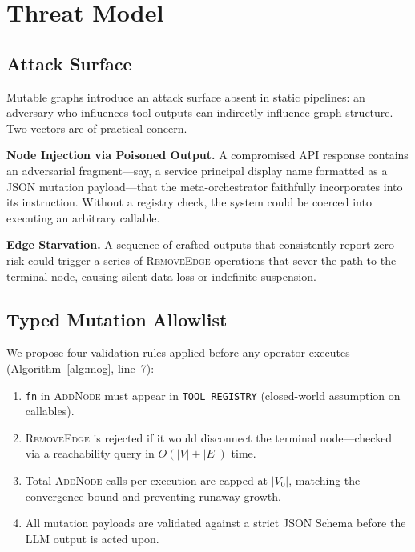 \documentclass[conference]{IEEEtran}
\begin{document}
\section{Threat Model}
\label{sec:threat}

\subsection{Attack Surface}

Mutable graphs introduce an attack surface absent in static pipelines:
an adversary who influences tool outputs can indirectly influence graph
structure. Two vectors are of practical concern.

\textbf{Node Injection via Poisoned Output.} A compromised API
response contains an adversarial fragment---say, a service principal
display name formatted as a JSON mutation payload---that the
meta-orchestrator faithfully incorporates into its instruction.
Without a registry check, the system could be coerced into executing
an arbitrary callable.

\textbf{Edge Starvation.} A sequence of crafted outputs that
consistently report zero risk could trigger a series of
\textsc{RemoveEdge} operations that sever the path to the terminal
node, causing silent data loss or indefinite suspension.

\subsection{Typed Mutation Allowlist}

We propose four validation rules applied before any operator executes
(Algorithm~\ref{alg:mog}, line~7):

\begin{enumerate}
  \item \texttt{fn} in \textsc{AddNode} must appear in
    \texttt{TOOL\_REGISTRY} (closed-world assumption on callables).
  \item \textsc{RemoveEdge} is rejected if it would disconnect the
    terminal node---checked via a reachability query in
    $O(|V|{+}|E|)$ time.
  \item Total \textsc{AddNode} calls per execution are capped at
    $|V_0|$, matching the convergence bound and preventing runaway
    growth.
  \item All mutation payloads are validated against a strict JSON
    Schema before the LLM output is acted upon.
\end{enumerate}
\end{document}
